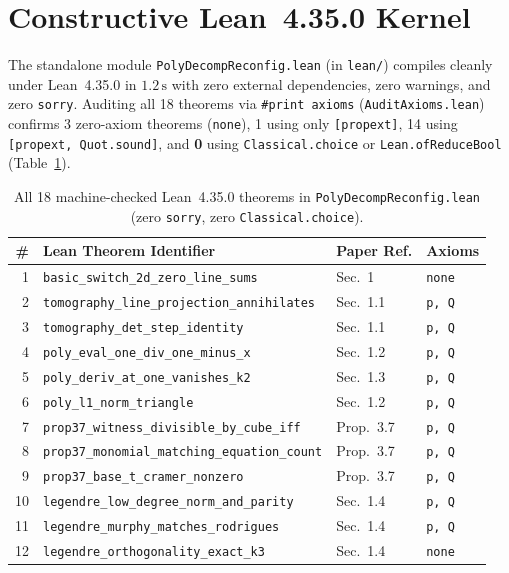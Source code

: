 \documentclass[10pt,twocolumn]{article}
\begin{document}
\section{Constructive Lean~4.35.0 Kernel}\label{sec:lean}
The standalone module \texttt{PolyDecompReconfig.lean} (in \texttt{lean/}) compiles cleanly under Lean~4.35.0 in $1.2\,\mathrm{s}$ with zero external dependencies, zero warnings, and zero \texttt{sorry}. Auditing all 18 theorems via \texttt{\#print axioms} (\texttt{AuditAxioms.lean}) confirms 3 zero-axiom theorems (\texttt{none}), 1 using only \texttt{[propext]}, 14 using \texttt{[propext, Quot.sound]}, and \textbf{0} using \texttt{Classical.choice} or \texttt{Lean.ofReduceBool} (Table~\ref{tab:lean}).

\begin{table}[t]
\centering
\caption{All 18 machine-checked Lean~4.35.0 theorems in \texttt{PolyDecompReconfig.lean} (zero \texttt{sorry}, zero \texttt{Classical.choice}).}
\label{tab:lean}
\scriptsize
\setlength{\tabcolsep}{1.7pt}
\begin{tabular}{@{}rlll@{}}
\toprule
\# & Lean Theorem Identifier & Paper Ref. & Axioms \\
\midrule
1 & \texttt{basic\_switch\_2d\_zero\_line\_sums} & Sec.~1 & \texttt{none} \\
2 & \texttt{tomography\_line\_projection\_annihilates} & Sec.~1.1 & \texttt{p, Q} \\
3 & \texttt{tomography\_det\_step\_identity} & Sec.~1.1 & \texttt{p, Q} \\
4 & \texttt{poly\_eval\_one\_div\_one\_minus\_x} & Sec.~1.2 & \texttt{p, Q} \\
5 & \texttt{poly\_deriv\_at\_one\_vanishes\_k2} & Sec.~1.3 & \texttt{p, Q} \\
6 & \texttt{poly\_l1\_norm\_triangle} & Sec.~1.2 & \texttt{p, Q} \\
7 & \texttt{prop37\_witness\_divisible\_by\_cube\_iff} & Prop.~3.7 & \texttt{p, Q} \\
8 & \texttt{prop37\_monomial\_matching\_equation\_count} & Prop.~3.7 & \texttt{p, Q} \\
9 & \texttt{prop37\_base\_t\_cramer\_nonzero} & Prop.~3.7 & \texttt{p, Q} \\
10 & \texttt{legendre\_low\_degree\_norm\_and\_parity} & Sec.~1.4 & \texttt{p, Q} \\
11 & \texttt{legendre\_murphy\_matches\_rodrigues} & Sec.~1.4 & \texttt{p, Q} \\
12 & \texttt{legendre\_orthogonality\_exact\_k3} & Sec.~1.4 & \texttt{none} \\

\end{tabular}
\end{table}
\end{document}
